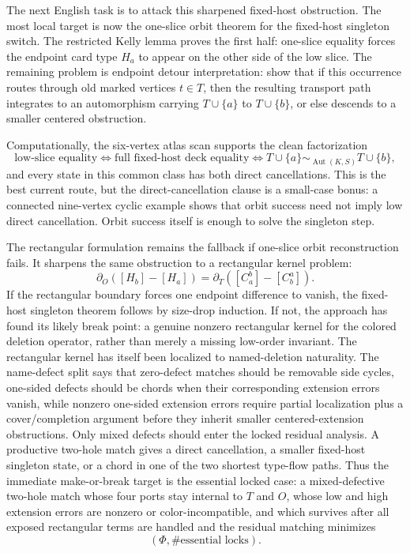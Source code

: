 \documentclass[11pt]{article}
\begin{document}
The next English task is to attack this sharpened fixed-host obstruction.  The
most local target is now the one-slice orbit theorem for the fixed-host
singleton switch.  The restricted Kelly lemma proves the first half:
one-slice equality forces the endpoint card type \(H_a\) to appear on the
other side of the low slice.  The remaining problem is endpoint detour
interpretation: show that if this occurrence routes through old marked
vertices \(t\in T\), then the resulting transport path integrates to an
automorphism carrying \(T\cup\{a\}\) to \(T\cup\{b\}\), or else descends to a
smaller centered obstruction.

Computationally, the six-vertex atlas scan supports the clean factorization
\[
  \text{low-slice equality}
  \Longleftrightarrow
  \text{full fixed-host deck equality}
  \Longleftrightarrow
  T\cup\{a\}\sim_{\operatorname{Aut}(K,S)}T\cup\{b\},
\]
and every state in this common class has both direct cancellations.  This is
the best current route, but the direct-cancellation clause is a small-case
bonus: a connected nine-vertex cyclic example shows that orbit success need
not imply low direct cancellation.  Orbit success itself is enough to solve
the singleton step.

The rectangular formulation remains the fallback if one-slice orbit
reconstruction fails.  It sharpens the same obstruction to a rectangular
kernel problem:
\[
  \partial_O([H_b]-[H_a])
  =
  \partial_T([C_a^b]-[C_b^a]).
\]
If the rectangular boundary forces one endpoint difference to vanish, the
fixed-host singleton theorem follows by size-drop induction.  If not, the
approach has found its likely break point: a genuine nonzero rectangular
kernel for the colored deletion operator, rather than merely a missing
low-order invariant.  The rectangular kernel has itself been localized to
named-deletion naturality.  The name-defect split says that zero-defect matches
should be removable side cycles, one-sided defects should be chords when their
corresponding extension errors vanish, while nonzero one-sided extension
errors require partial localization plus a cover/completion argument before
they inherit smaller centered-extension obstructions.  Only mixed defects
should enter the locked residual analysis.  A productive two-hole match gives
a direct cancellation, a smaller fixed-host singleton state, or a chord in one
of the two shortest type-flow paths.  Thus the immediate make-or-break target
is the essential locked case: a mixed-defective two-hole match whose four ports
stay internal to \(T\) and \(O\), whose low and high extension errors are
nonzero or color-incompatible, and which survives after all exposed
rectangular terms are handled and the residual matching minimizes
\[
  (\Phi,\#\text{essential locks}).
\]
\end{document}
